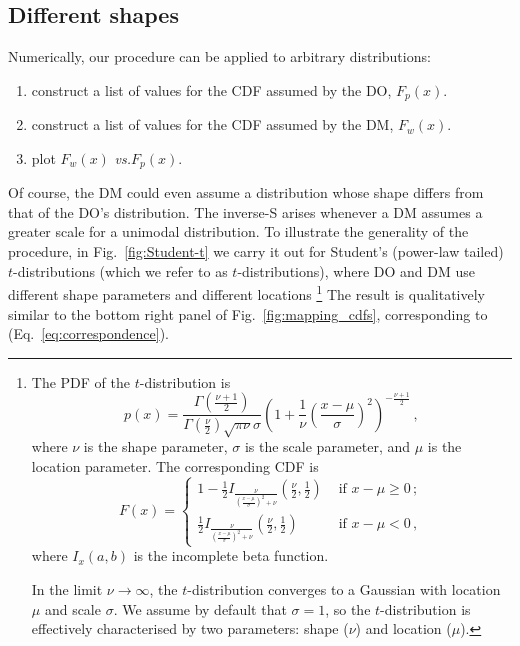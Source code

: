 \documentclass[%
	a4paper,
	abstract=true,	
	12pt,
	numbers=noenddot,
]{scrartcl}
\newcommand{\eref}[1]{(Eq.~\ref{eq:#1})}
\newcommand{\fref}[1]{Fig.~\ref{fig:#1}}
\newcommand{\seclabel}[1]{\label{sec:#1}}
\newcommand{\vs}{\textit{vs.}\xspace}
\newcommand{\be}{\begin{equation}}
\newcommand{\ee}{\end{equation}}
\begin{document}
\subsection{Different shapes\seclabel{Different_shapes}}
Numerically, our procedure can be applied to arbitrary distributions:
\begin{enumerate}
\item
construct a list of values for the CDF assumed by the DO, $F_p(x)$.
\item
construct a list of values for the CDF assumed by the DM, $F_w(x)$.
\item
plot $F_w(x)$ \vs $F_p(x)$.
\end{enumerate}
Of course, the DM could even assume a distribution whose shape differs from that of the DO's distribution.
The inverse-S arises whenever a DM assumes a greater scale for a unimodal distribution.
To illustrate the generality of the procedure, in \fref{Student-t} we carry it out for Student's (power-law tailed) $t$-distributions (which we refer to as $t$-distributions), where DO and DM use different shape parameters and different locations
\footnote{
The PDF of the $t$-distribution is
%
\be
p\left(x\right) = \frac{\Gamma\left(\frac{\nu+1}{2}\right)} {\Gamma\left(\frac{\nu}{2}\right)\sqrt{\pi\nu}\sigma} \left(1+\frac{1}{\nu}\left(\frac{x-\mu}{\sigma}\right)^2 \right)^{-\frac{\nu+1}{2}}\,,
\ee
%
where $\nu$ is the shape parameter, $\sigma$ is the scale parameter, and $\mu$ is the location parameter. The corresponding CDF is
%
\be
F\left(x\right) =
\begin{cases}
1 - \frac{1}{2} I_{\frac{\nu}{\left(\frac{x-\mu}{\sigma}\right)^2 + \nu}}\left(\frac{\nu}{2},\frac{1}{2}\right) &\text{ if } x-\mu \geq 0\,;\\
\frac{1}{2} I_{\frac{\nu}{\left(\frac{x-\mu}{\sigma}\right)^2 + \nu}}\left(\frac{\nu}{2},\frac{1}{2}\right) &\text{ if } x-\mu < 0\,,
\end{cases}
\ee
%
where $I_x\left(a,b\right)$ is the incomplete beta function.

In the limit $\nu \rightarrow \infty$, the $t$-distribution converges to a Gaussian with location $\mu$ and scale $\sigma$. We assume by default that $\sigma = 1$, so the $t$-distribution is effectively characterised by two parameters: shape ($\nu$) and location ($\mu$).
}
The result is qualitatively similar to the bottom right panel of \fref{mapping_cdfs}, corresponding to \eref{correspondence}.
\end{document}
